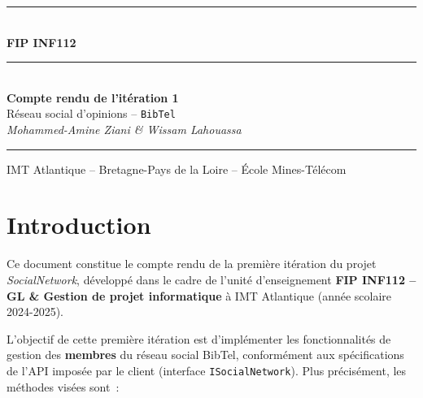 \documentclass[12pt,a4paper]{article}
\begin{document}

\begin{titlepage}
  \centering
  \vspace*{1cm}

  {\color{imtblue}\rule{\linewidth}{2pt}}\\[0.4cm]

  {\Large\bfseries\color{imtblue} FIP INF112}\\[0.3cm]
  {\color{imtblue}\rule{\linewidth}{0.8pt}}\\[1.5cm]

  {\Huge\bfseries Compte rendu de l'itération 1}\\[0.8cm]
  {\LARGE\color{imtblue} Réseau social d'opinions -- \texttt{BibTel}}\\[0.5cm]
  {\Large\itshape Mohammed-Amine Ziani \& Wissam Lahouassa}\\[2cm]

  \vfill
  {\color{imtblue}\rule{\linewidth}{2pt}}
  \vspace{0.3cm}

  {\small IMT Atlantique -- Bretagne-Pays de la Loire -- École Mines-Télécom}
\end{titlepage}

\tableofcontents
\newpage

\section{Introduction}

Ce document constitue le compte rendu de la première itération du projet \textit{SocialNetwork},
développé dans le cadre de l'unité d'enseignement \textbf{FIP INF112 -- GL \& Gestion de projet
informatique} à IMT Atlantique (année scolaire 2024-2025).

L'objectif de cette première itération est d'implémenter les fonctionnalités de gestion des
\textbf{membres} du réseau social BibTel, conformément aux spécifications de l'API imposée par le client
(interface \texttt{ISocialNetwork}).  Plus précisément, les méthodes visées sont~:
\end{document}
